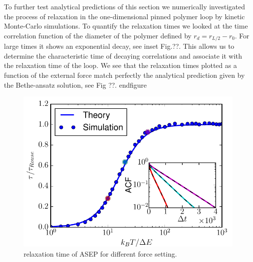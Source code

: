 \documentclass[aps,showpacs,twocolumn,floatfix,prx,superscriptaddress]{revtex4-1}
\begin{document}
To further test analytical predictions of this section we numerically investigated the process of relaxation in the one-dimensional pinned polymer loop by kinetic Monte-Carlo simulations. To quantify the relaxation times we looked at the time correlation function of the diameter of the polymer defined by $r_d = r_{L/2} - r_0$. For large times it shows an exponential decay, see inset Fig.??. This allows us to determine the characteristic time of decaying correlations and associate it with the relaxation time of the loop. We see that the relaxation times plotted as a function of the external force match perfectly the analytical prediction given by the Bethe-ansatz solution, see Fig ??.
end{figure}

\begin{figure}[htpb]
   \centering
   \includegraphics[width=0.8\linewidth]{relaxation1D}
   \caption{relaxation time of ASEP for different force setting.}
   \label{fig:relaxation1D}
\end{figure}



%
%
%
%
%
%
%
\end{document}
